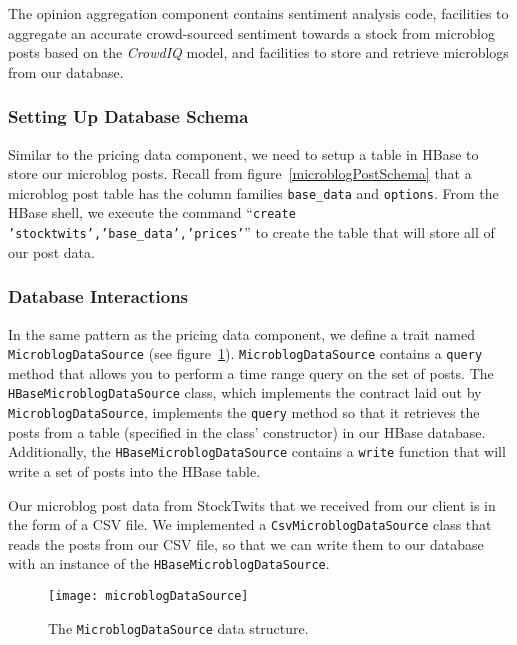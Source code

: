 The opinion aggregation component contains sentiment analysis code, facilities to aggregate an accurate crowd-sourced sentiment towards a stock from microblog posts based on the \textit{CrowdIQ} model, and facilities to store and retrieve microblogs from our database.

\subsubsection{Setting Up Database Schema}

Similar to the pricing data component, we need to setup a table in HBase to store our microblog posts.
Recall from figure~\ref{microblogPostSchema} that a microblog post table has the column families \texttt{base\_data} and \texttt{options}.
From the HBase shell, we execute the command ``\texttt{create 'stocktwits','base\_data','prices'}'' to create the table that will store all of our post data.

\subsubsection{Database Interactions}

In the same pattern as the pricing data component, we define a trait named \texttt{MicroblogDataSource} (see figure~\ref{microblogDataSource}).
\texttt{MicroblogDataSource} contains a \texttt{query} method that allows you to perform a time range query on the set of posts.
The \texttt{HBaseMicroblogDataSource} class, which implements the contract laid out by \texttt{MicroblogDataSource}, implements the \texttt{query} method so that it retrieves the posts from a table (specified in the class' constructor) in our HBase database.
Additionally, the \texttt{HBaseMicroblogDataSource} contains a \texttt{write} function that will write a set of posts into the HBase table.

Our microblog post data from StockTwits that we received from our client is in the form of a CSV file.
We implemented a \texttt{CsvMicroblogDataSource} class that reads the posts from our CSV file, so that we can write them to our database with an instance of the \texttt{HBaseMicroblogDataSource}.

\begin{figure}[h]
  \label{microblogDataSource}
  \begin{center}
    \texttt{[image: microblogDataSource]}
  \end{center}
  \caption{The \texttt{MicroblogDataSource} data structure.}
\end{figure}

